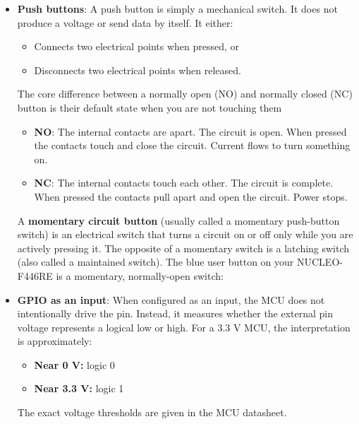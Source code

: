 \documentclass{report}
\begin{document}
\begin{itemize}
\begin{center}
                3.3 V -- resistor -- LED -- GPIO pin
            \end{center}
            This is active-low. You must inspect the board schematic to determine which arrangement is used.
        \item \textbf{Push buttons}: A push button is simply a mechanical switch. It does not produce a voltage or send data by itself. It either:
            \begin{itemize}
                \item Connects two electrical points when pressed, or
                \item Disconnects two electrical points when released.
            \end{itemize}
            The core difference between a normally open (NO) and normally closed (NC) button is their default state when you are not touching them
            \begin{itemize}
                \item \textbf{NO}: The internal contacts are apart. The circuit is open. When pressed the contacts touch and close the circuit. Current flows to turn something on.
                \item \textbf{NC}: The internal contacts touch each other. The circuit is complete. When pressed the contacts pull apart and open the circuit. Power stops.
            \end{itemize}
            A \textbf{momentary circuit button} (usually called a momentary push-button switch) is an electrical switch that turns a circuit on or off only while you are actively pressing it.
            \bigbreak \noindent 
            The opposite of a momentary switch is a latching switch (also called a maintained switch).
            \bigbreak \noindent 
            The blue user button on your NUCLEO-F446RE is a momentary, normally-open switch:
        \item \textbf{GPIO as an input}: When configured as an input, the MCU does not intentionally drive the pin. Instead, it measures whether the external pin voltage represents a logical low or high.
            \bigbreak \noindent 
            For a 3.3 V MCU, the interpretation is approximately:
            \begin{itemize}
                \item \textbf{Near 0 V:}  logic 0
                \item \textbf{Near 3.3 V:}  logic 1
            \end{itemize}
            The exact voltage thresholds are given in the MCU datasheet.

\end{itemize}
\end{document}
